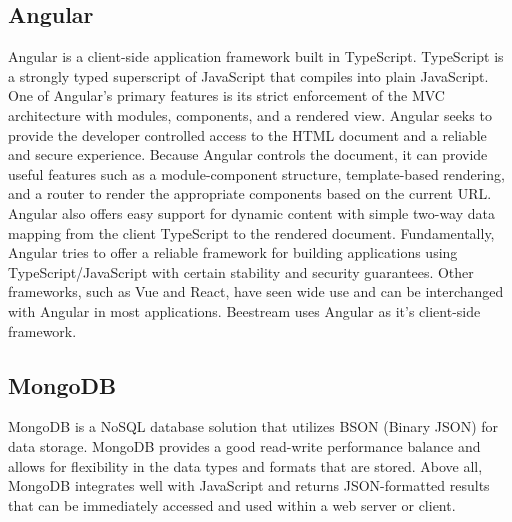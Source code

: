 \subsection{Angular}
Angular \cite{angular} is a client-side application framework built in TypeScript.  TypeScript \cite{typescript} is a strongly typed superscript of JavaScript that compiles into plain JavaScript.  One of Angular’s primary features is its strict enforcement of the MVC architecture with modules, components, and a rendered view.  Angular seeks to provide the developer controlled access to the HTML document and a reliable and secure experience.  Because Angular controls the document, it can provide useful features such as a module-component structure, template-based rendering, and a router to render the appropriate components based on the current URL.  Angular also offers easy support for dynamic content with simple two-way data mapping from the client TypeScript to the rendered document.  Fundamentally, Angular tries to offer a reliable framework for building applications using TypeScript/JavaScript with certain stability and security guarantees.  Other frameworks, such as Vue and React, have seen wide use and can be interchanged with Angular in most applications.  Beestream uses Angular as it’s client-side framework. \par

\subsection{MongoDB}
MongoDB \cite{mongo} is a NoSQL database solution that utilizes BSON (Binary JSON) for data storage.  MongoDB provides a good read-write performance balance and allows for flexibility in the data types and formats that are stored.  Above all, MongoDB integrates well with JavaScript and returns JSON-formatted results that can be immediately accessed and used within a web server or client. \par
